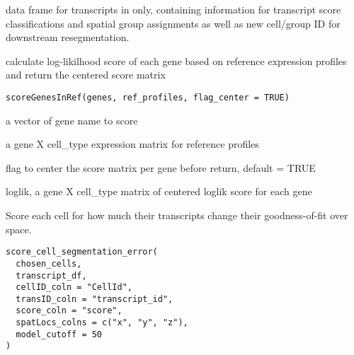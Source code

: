 \documentclass[letterpaper]{book}
\begin{document}
%
\begin{Value}
data frame for transcripts in  only, containing information for transcript score classifications and spatial group assignments as well as new cell/group ID for downstream resegmentation.
\end{Value}
%
\begin{Description}
calculate log-likilhood score of each gene based on reference expression profiles and return the centered score matrix
\end{Description}
%
\begin{Usage}
\begin{verbatim}
scoreGenesInRef(genes, ref_profiles, flag_center = TRUE)
\end{verbatim}
\end{Usage}
%
\begin{Arguments}
\begin{ldescription}
\item[\code{genes}] a vector of gene name to score

\item[\code{ref\_profiles}] a gene X cell\_type expression matrix for reference profiles

\item[\code{flag\_center}] flag to center the score matrix per gene before return, default = TRUE
\end{ldescription}
\end{Arguments}
%
\begin{Value}
loglik, a gene X cell\_type matrix of centered loglik score for each gene
\end{Value}
%
\begin{Description}
Score each cell for how much their transcripts change their goodness-of-fit over space.
\end{Description}
%
\begin{Usage}
\begin{verbatim}
score_cell_segmentation_error(
  chosen_cells,
  transcript_df,
  cellID_coln = "CellId",
  transID_coln = "transcript_id",
  score_coln = "score",
  spatLocs_colns = c("x", "y", "z"),
  model_cutoff = 50
)
\end{verbatim}
\end{Usage}
%
\end{document}
